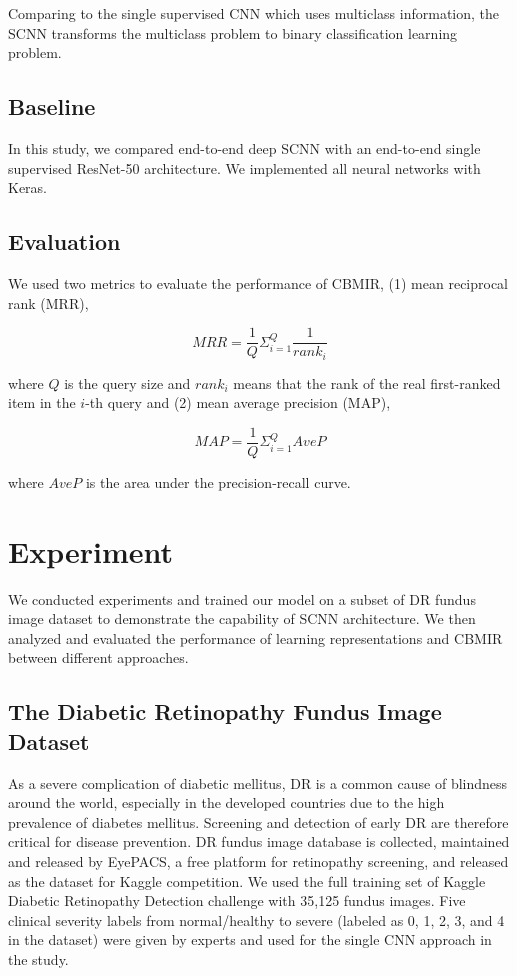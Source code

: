 \documentclass{article}
\begin{document}
Comparing to the single supervised CNN which uses multiclass information, the SCNN transforms the multiclass problem to binary classification learning problem.

\subsection{Baseline}
In this study, we compared end-to-end deep SCNN with an end-to-end single supervised ResNet-50 architecture.
We implemented all neural networks with Keras.

\subsection{Evaluation}
We used two metrics to evaluate the performance of CBMIR, (1) mean reciprocal rank (MRR), 

$$MRR = \frac{1}{Q} \Sigma_{i=1}^{Q} \frac{1}{rank_i}$$

where $Q$ is the query size and $rank_i$ means that the rank of the real first-ranked item in the $i$-th query and (2) mean average precision (MAP), 

$$MAP = \frac{1}{Q} \Sigma_{i=1}^{Q} AveP$$

where $AveP$ is the area under the precision-recall curve.

\section{Experiment}
We conducted experiments and trained our model on a subset of DR fundus image dataset to demonstrate the capability of SCNN architecture.
We then analyzed and evaluated the performance of learning representations and CBMIR between different approaches.

\subsection{The Diabetic Retinopathy Fundus Image Dataset}
As a severe complication of diabetic mellitus, DR is a common cause of blindness around the world, especially in the developed countries due to the high prevalence of diabetes mellitus.
Screening and detection of early DR are therefore critical for disease prevention.  
DR fundus image database is collected, maintained and released by EyePACS, a free platform for retinopathy screening, and released as the dataset for Kaggle competition.
We used the full training set of Kaggle Diabetic Retinopathy Detection challenge with 35,125 fundus images. 
Five clinical severity labels from normal/healthy to severe (labeled as 0, 1, 2, 3, and 4 in the dataset) were given by experts and used for the single CNN approach in the study. 
\end{document}
